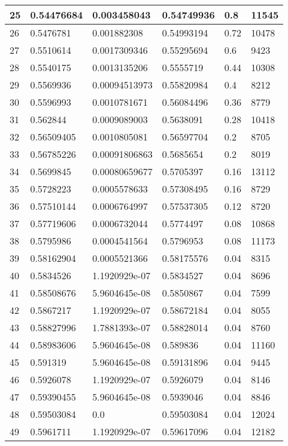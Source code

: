 \begin{longtable}{|l|l|l|l|l|l|}
25 & 0.54476684 & 0.003458043 & 0.54749936 & 0.8 & 11545 \\ \hline 
26 & 0.5476781 & 0.001882308 & 0.54993194 & 0.72 & 10478 \\ \hline 
27 & 0.5510614 & 0.0017309346 & 0.55295694 & 0.6 & 9423 \\ \hline 
28 & 0.5540175 & 0.0013135206 & 0.5555719 & 0.44 & 10308 \\ \hline 
29 & 0.5569936 & 0.00094513973 & 0.55820984 & 0.4 & 8212 \\ \hline 
30 & 0.5596993 & 0.0010781671 & 0.56084496 & 0.36 & 8779 \\ \hline 
31 & 0.562844 & 0.0009089003 & 0.5638091 & 0.28 & 10418 \\ \hline 
32 & 0.56509405 & 0.0010805081 & 0.56597704 & 0.2 & 8705 \\ \hline 
33 & 0.56785226 & 0.00091806863 & 0.5685654 & 0.2 & 8019 \\ \hline 
34 & 0.5699845 & 0.00080659677 & 0.5705397 & 0.16 & 13112 \\ \hline 
35 & 0.5728223 & 0.0005578633 & 0.57308495 & 0.16 & 8729 \\ \hline 
36 & 0.57510144 & 0.0006764997 & 0.57537305 & 0.12 & 8720 \\ \hline 
37 & 0.57719606 & 0.0006732044 & 0.5774497 & 0.08 & 10868 \\ \hline 
38 & 0.5795986 & 0.0004541564 & 0.5796953 & 0.08 & 11173 \\ \hline 
39 & 0.58162904 & 0.0005521366 & 0.58175576 & 0.04 & 8315 \\ \hline 
40 & 0.5834526 & 1.1920929e-07 & 0.5834527 & 0.04 & 8696 \\ \hline 
41 & 0.58508676 & 5.9604645e-08 & 0.5850867 & 0.04 & 7599 \\ \hline 
42 & 0.5867217 & 1.1920929e-07 & 0.58672184 & 0.04 & 8055 \\ \hline 
43 & 0.58827996 & 1.7881393e-07 & 0.58828014 & 0.04 & 8760 \\ \hline 
44 & 0.58983606 & 5.9604645e-08 & 0.589836 & 0.04 & 11160 \\ \hline 
45 & 0.591319 & 5.9604645e-08 & 0.59131896 & 0.04 & 9445 \\ \hline 
46 & 0.5926078 & 1.1920929e-07 & 0.5926079 & 0.04 & 8146 \\ \hline 
47 & 0.59390455 & 5.9604645e-08 & 0.5939046 & 0.04 & 8846 \\ \hline 
48 & 0.59503084 & 0.0 & 0.59503084 & 0.04 & 12024 \\ \hline 
49 & 0.5961711 & 1.1920929e-07 & 0.59617096 & 0.04 & 12182 \\ \hline 

\end{longtable}

